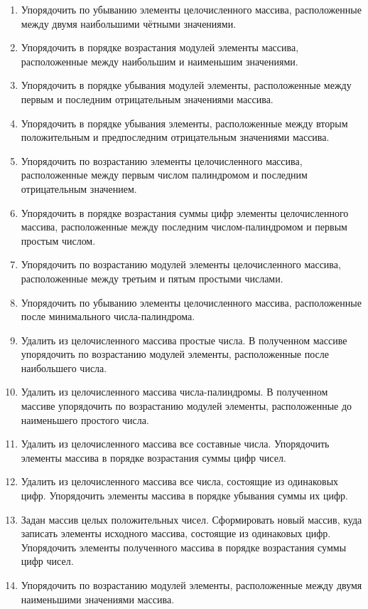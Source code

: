 \begin{enumerate}
\item Упорядочить по убыванию элементы целочисленного массива, расположенные между двумя наибольшими чётными значениями.
\item Упорядочить в порядке возрастания модулей элементы массива, расположенные между наибольшим и наименьшим
значениями.
\item Упорядочить в порядке убывания модулей элементы, расположенные между первым и последним отрицательным значениями
массива.
\item Упорядочить в порядке убывания элементы, расположенные между вторым положительным и предпоследним отрицательным
значениями массива.
\item Упорядочить по возрастанию элементы целочисленного массива, расположенные между первым числом палиндромом и
последним отрицательным значением.
\item Упорядочить в порядке возрастания суммы цифр элементы целочисленного массива, расположенные между последним
числом-палиндромом и первым простым числом.
\item Упорядочить по возрастанию модулей элементы целочисленного массива, расположенные между третьим и пятым простыми
числами.
\item Упорядочить по убыванию элементы целочисленного массива, расположенные после минимального числа-палиндрома.
\item Удалить из целочисленного массива простые числа. В полученном массиве упорядочить по возрастанию модулей элементы,
расположенные после наибольшего числа.
\item Удалить из целочисленного массива числа-палиндромы. В полученном массиве упорядочить по возрастанию модулей
элементы, расположенные до наименьшего простого числа.
\item Удалить из целочисленного массива все составные числа. Упорядочить элементы массива в порядке возрастания суммы
цифр чисел.
\item Удалить из целочисленного массива все числа, состоящие из одинаковых цифр. Упорядочить элементы массива в порядке
убывания суммы их цифр.
\item Задан массив целых положительных чисел. Сформировать новый массив, куда записать элементы исходного массива,
состоящие из одинаковых цифр. Упорядочить элементы полученного массива в порядке возрастания суммы цифр чисел.
\item Упорядочить по возрастанию модулей элементы, расположенные между двумя наименьшими значениями массива.

\end{enumerate}
